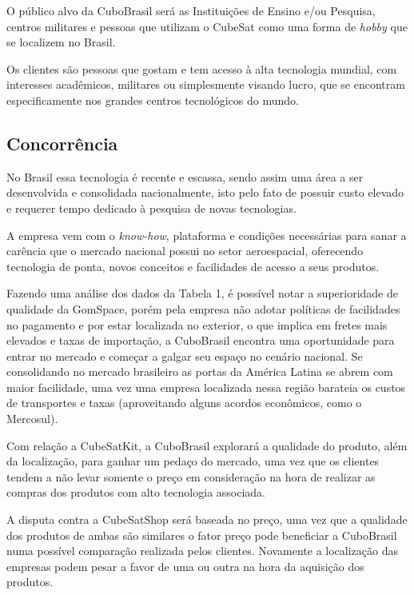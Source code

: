 \documentclass[
	12pt,				%
	openright,			%
	oneside,			%
	a4paper,			%
	english,			%
	french,				%
	spanish,			%
	brazil				%
	]{abntex2}
\begin{document}
	O público alvo da CuboBrasil será as Instituições de Ensino e/ou Pesquisa, centros militares e pessoas que utilizam o CubeSat como uma forma de \textit{hobby} que se localizem no Brasil.
	
	Os clientes são pessoas que gostam e tem acesso à alta tecnologia mundial, com interesses acadêmicos, militares ou simplesmente visando lucro, que se encontram especificamente nos grandes centros tecnológicos do mundo.


\subsection[Concorrência]{Concorrência}

	No Brasil essa tecnologia é recente e escassa, sendo assim uma área a ser desenvolvida e consolidada nacionalmente, isto pelo fato de possuir custo elevado e requerer tempo dedicado à pesquisa de novas tecnologias.
	
	A empresa vem com o \textit{know-how}, plataforma e condições necessárias para sanar a carência que o mercado nacional possui no setor aeroespacial, oferecendo tecnologia de ponta, novos conceitos e facilidades de acesso a seus produtos.
	
	Fazendo uma análise dos dados da Tabela 1, é possível notar a superioridade de qualidade da GomSpace, porém pela empresa não adotar políticas de facilidades no pagamento e por estar localizada no exterior, o que implica em fretes mais elevados e taxas de importação, a CuboBrasil encontra uma oportunidade para entrar no mercado e começar a galgar seu espaço no cenário nacional. Se consolidando no mercado brasileiro as portas da América Latina se abrem com maior facilidade, uma vez uma empresa localizada nessa região barateia os custos de transportes e taxas (aproveitando alguns acordos econômicos, como o Mercosul). 
	
	Com relação a CubeSatKit, a CuboBrasil explorará a qualidade do produto, além da localização, para ganhar um pedaço do mercado, uma vez que os clientes tendem a não levar somente o preço em consideração na hora de realizar as compras dos produtos com alto tecnologia associada.
	
	A disputa contra a CubeSatShop será baseada no preço, uma vez que a qualidade dos produtos de ambas são similares o fator preço pode beneficiar a CuboBrasil numa possível comparação realizada pelos clientes. Novamente a localização das empresas podem pesar a favor de uma ou outra na hora da aquisição dos produtos.
	
\end{document}
